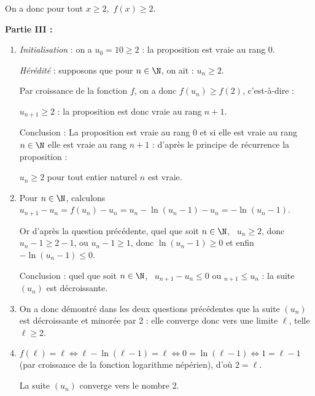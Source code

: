 \begin{enumerate}
\begin{enumerate}
On a donc pour tout $x \geqslant  2$,\,  $f(x) \geqslant  2$.
	\end{enumerate}
\end{enumerate}

\bigskip

\textbf{Partie III :}

\medskip

\begin{enumerate}
\item %
\emph{Initialisation} : on a $u_0 = 10 \geqslant 2$
 : la proposition est vraie au rang $0$.

\emph{Hérédité} : supposons que pour $n \in \N$, on ait : $u_n \geqslant 2$.

Par croissance de la fonction $f$, on a donc $f\left(u_n\right) \geqslant f(2)$, c'est-à-dire :

$u_{n+1} \geqslant 2$ : la proposition est donc vraie au rang $n + 1$.

Conclusion : La proposition est vraie au rang $0$ et si elle est vraie au rang $n \in \N$ elle est vraie au rang $n + 1$ : d'après le principe de récurrence la proposition :

\og $u_n \geqslant  2$ pour tout entier naturel $n$\fg{} est vraie.
 \item %
Pour $n \in \N$, calculons $u_{n+1} - u_n  = f\left(u_n \right) - u_n = u_n - \ln \left(u_n - 1 \right) - u_n = - \ln \left(u_n - 1 \right)$.

Or d'après la question précédente, quel que soit $n \in \N$, \, $u_n \geqslant 2$, donc $u_n - 1 \geqslant 2 - 1$, ou $u_n - 1 \geqslant 1$, donc $\ln \left(u_n - 1 \right) \geqslant 0$ et enfin $- \ln \left(u_n - 1 \right) \leqslant 0$.

Conclusion : quel que soit $n \in \N$, \, $u_{n+1} - u_n \leqslant 0$ ou $_{n+1} \leqslant u_n$ : la suite $\left(u_n\right)$ est décroissante.
\item %
On a donc démontré dans les deux questions précédentes que la suite $\left(u_n\right)$ est décroissante et minorée par 2 : elle converge donc vers une limite $\ell$, telle $\ell \geqslant 2$.
\item %
$f(\ell) = \ell \iff \ell - \ln (\ell - 1) = \ell \iff 0 = \ln (\ell- 1) \iff 1 = \ell - 1$ (par croissance de la fonction logarithme népérien), d'où $2 = \ell$.

La suite $\left(u_n\right)$ converge vers le nombre $2$.
\end{enumerate}
